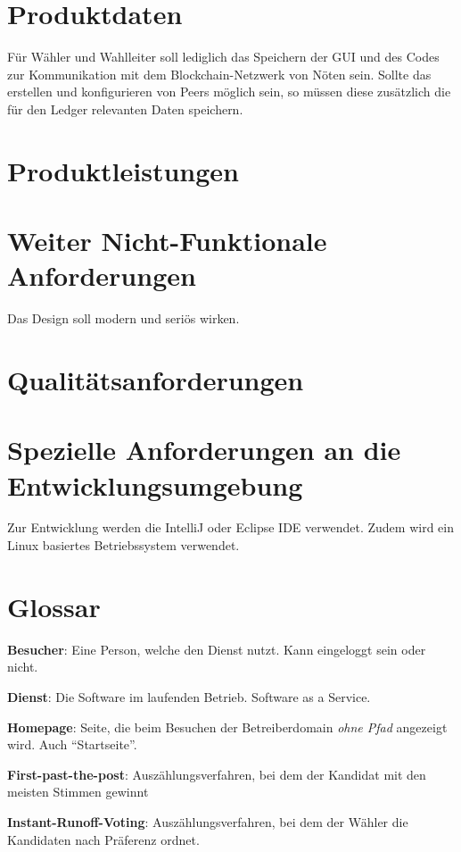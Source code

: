\documentclass[parskip=full,11pt,twoside]{scrartcl}
\begin{document}
\section{Produktdaten}
Für Wähler und Wahlleiter soll lediglich das Speichern der GUI und des Codes zur Kommunikation mit dem Blockchain-Netzwerk von Nöten sein. Sollte das erstellen und konfigurieren von Peers möglich sein, so müssen diese zusätzlich die für den Ledger relevanten Daten speichern.

\section{Produktleistungen}


\section{Weiter Nicht-Funktionale Anforderungen}


Das Design soll modern und seriös wirken.


\section{Qualitätsanforderungen}

\section{Spezielle Anforderungen an die Entwicklungsumgebung}
Zur Entwicklung werden die IntelliJ oder Eclipse IDE verwendet.
Zudem wird ein Linux basiertes Betriebssystem verwendet.

\section{Glossar}

\textbf{Besucher}:
Eine Person, welche den Dienst nutzt.
Kann eingeloggt sein oder nicht.

\textbf{Dienst}:
Die Software im laufenden Betrieb. Software as a Service.

\textbf{Homepage}:
Seite, die beim Besuchen der Betreiberdomain \emph{ohne Pfad} angezeigt wird. Auch \enquote{Startseite}.

\textbf{First-past-the-post}:
Auszählungsverfahren, bei dem der Kandidat mit den meisten Stimmen gewinnt

\textbf{Instant-Runoff-Voting}:
Auszählungsverfahren, bei dem der Wähler die Kandidaten nach Präferenz ordnet.
\end{document}
